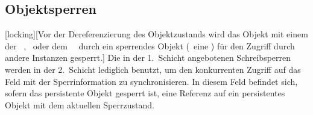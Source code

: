 \subsection{Objektsperren}%
[locking][{Vor der Dereferenzierung des
Objektzustands wird das Objekt
mit einem der \protect{}\ \protect{},
\protect{}\ oder dem
\protect{}\ \protect{}\ durch ein
sperrendes Objekt (\protect\ia\ eine \protect{})
f\"{u}r den Zugriff durch andere Instanzen gesperrt.}]%
%
Die in der 1.~Schicht angebotenen Schreibsperren werden in der
2.~Schicht lediglich benutzt, um den konkurrenten Zugriff auf das Feld
mit der Sperrinformation zu synchronisieren. In diesem Feld befindet
sich, sofern das persistente Objekt gesperrt ist, eine Referenz auf
ein persistentes Objekt mit dem aktuellen Sperrzustand.
%
